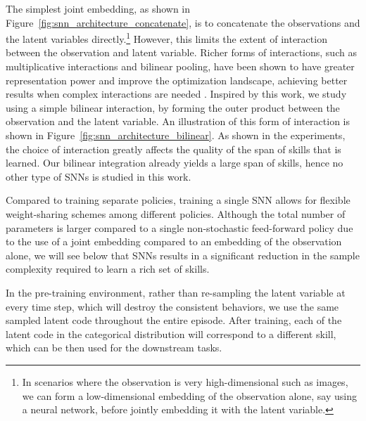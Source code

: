 \documentclass{article} %
\begin{document}
The simplest joint embedding, as shown in Figure~\ref{fig:snn_architecture_concatenate}, is to concatenate the observations and the latent variables directly.\footnote{In scenarios where the observation is very high-dimensional such as images, we can form a low-dimensional embedding of the observation alone, say using a neural network, before jointly embedding it with the latent variable.} However, this limits the extent of interaction between the observation and latent variable. Richer forms of interactions, such as multiplicative interactions and bilinear pooling, have been shown to have greater representation power and improve the optimization landscape, achieving better results when complex interactions are needed \citep{fukui2016multimodal, wu2016multiplicative}. Inspired by this work, we study using a simple bilinear interaction, by forming the outer product between the observation and the latent variable. An illustration of this form of interaction is shown in Figure~\ref{fig:snn_architecture_bilinear}. As shown in the experiments, the choice of interaction greatly affects the quality of the span of skills that is learned. Our bilinear integration already yields a large span of skills, hence no other type of SNNs is studied in this work.


Compared to training separate policies, training a single SNN allows for flexible weight-sharing schemes among different policies. Although the total number of parameters is larger compared to a single non-stochastic feed-forward policy due to the use of a joint embedding compared to an embedding of the observation alone, we will see below that SNNs results in a significant reduction in the sample complexity required to learn a rich set of skills.

In the pre-training environment, rather than re-sampling the latent variable at every time step, which will destroy the consistent behaviors, we use the same sampled latent code throughout the entire episode. After training, each of the latent code in the categorical distribution will correspond to a different skill, which can be then used for the downstream tasks.


\end{document}
